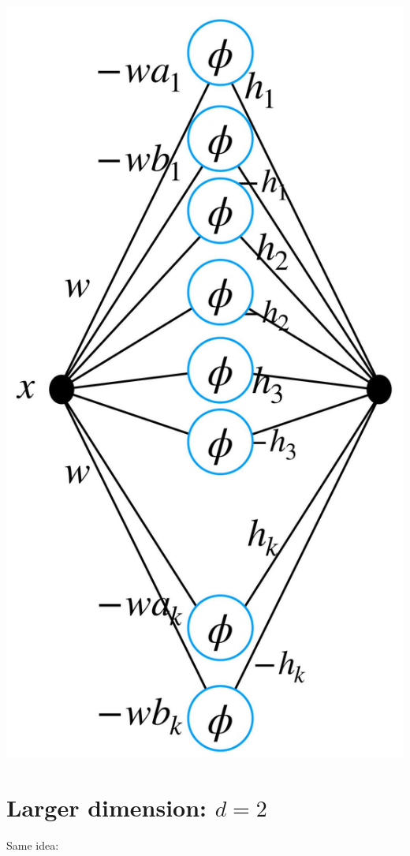 \documentclass[10pt]{article}
\begin{document}
\begin{center}
\includegraphics[max width=\textwidth]{2024_01_08_0e0dcffe4bc8c6049046g-26}
\end{center}

\section*{Larger dimension: $d=2$}
Same idea:
\end{document}
